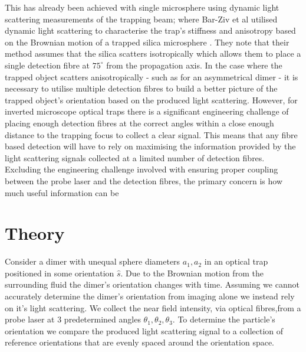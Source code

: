 \documentclass[11pt]{article}
\begin{document}
This has already been achieved with single microsphere using dynamic light scattering measurements of the trapping beam; where Bar-Ziv et al utilised dynamic light scattering to characterise the trap's stiffness and anisotropy based on the Brownian motion of a trapped silica microsphere \cite{1}. They note that their method assumes that the silica scatters isotropically which allows them to place a single detection fibre at $75^\circ$ from the propagation axis. In the case where the trapped object scatters anisotropically - such as for an asymmetrical dimer - it is necessary to utilise multiple detection fibres to build a better picture of the trapped object's orientation based on the produced light scattering. However, for inverted microscope optical traps there is a significant engineering challenge of placing enough detection fibres at the correct angles within a close enough distance to the trapping focus to collect a clear signal. This means that any fibre based detection will have to rely on maximising the information provided by the light scattering signals collected at a limited number of detection fibres. Excluding the engineering challenge involved with ensuring proper coupling between the probe laser and the detection fibres, the primary concern is how much useful information can be

\section*{Theory}

Consider a dimer with unequal sphere diameters $a_1, a_2$ in an optical trap positioned in some orientation $\hat{s}$. Due to the Brownian motion from the surrounding fluid the dimer's orientation changes with time. Assuming we cannot accurately determine the dimer's orientation from imaging alone we instead rely on it's light scattering. We collect the near field intensity, via optical fibres,from a probe laser at 3 predetermined angles $\theta_1, \theta_2, \theta_3$. To determine the particle's orientation we compare the produced light scattering signal to a collection of reference orientations that are evenly spaced around the orientation space.   
\end{document}
